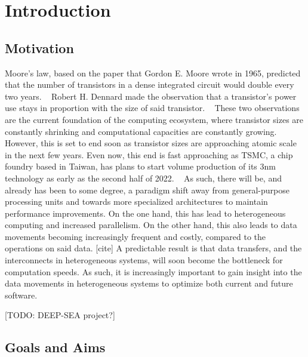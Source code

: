 
\chapter{Introduction}\label{chapter:introduction}

\section{Motivation}

Moore's law, based on the paper that Gordon E. Moore wrote in 1965, predicted that the number of transistors in a dense integrated circuit would double every two years. ~\cite{moore_cramming_1965} Robert H. Dennard made the observation that a transistor's power use stays in proportion with the size of said transistor. ~\cite{dennard_design_1974} These two observations are the current foundation of the computing ecosystem, where transistor sizes are constantly shrinking and computational capacities are constantly growing. However, this is set to end soon as transistor sizes are approaching atomic scale in the next few years. \cite{shalf_computing_2015}  Even now, this end is fast approaching as TSMC, a chip foundry based in Taiwan, has plans to start volume production of its 3nm technology as early as the second half of 2022. ~\cite{tsmc_5nm_2022} As such, there will be, and already has been to some degree, a paradigm shift away from general-purpose processing units and towards more specialized architectures to maintain performance improvements. On the one hand, this has lead to heterogeneous computing and increased parallelism. On the other hand, this also leads to data movements becoming increasingly frequent and costly, compared to the operations on said data. [cite] A predictable result is that data transfers, and the interconnects in heterogeneous systems, will soon become the bottleneck for computation speeds. As such, it is increasingly important to gain insight into the data movements in heterogeneous systems to optimize both current and future software.

[TODO: DEEP-SEA project?]
\section{Goals and Aims}

